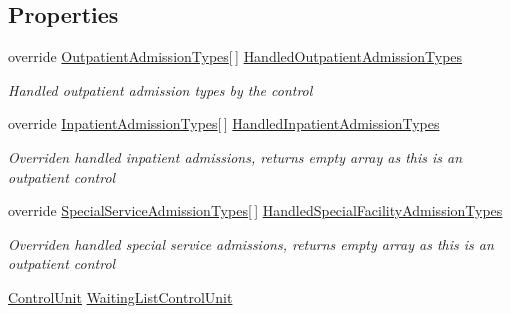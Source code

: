 \subsection*{Properties}
\begin{DoxyCompactItemize}
\item 
override \hyperlink{class_general_health_care_elements_1_1_treatment_admission_types_1_1_outpatient_admission_types}{Outpatient\+Admission\+Types}\mbox{[}$\,$\mbox{]} \hyperlink{class_general_health_care_elements_1_1_department_models_1_1_outpatient_1_1_control_unit_outpatient_a00f2c804949928f3f9b6671727c060bd}{Handled\+Outpatient\+Admission\+Types}
\begin{DoxyCompactList}\small\item\em Handled outpatient admission types by the control \end{DoxyCompactList}\item 
override \hyperlink{class_general_health_care_elements_1_1_treatment_admission_types_1_1_inpatient_admission_types}{Inpatient\+Admission\+Types}\mbox{[}$\,$\mbox{]} \hyperlink{class_general_health_care_elements_1_1_department_models_1_1_outpatient_1_1_control_unit_outpatient_afc1ac3cf602c8c0f2265ad08d79cccde}{Handled\+Inpatient\+Admission\+Types}
\begin{DoxyCompactList}\small\item\em Overriden handled inpatient admissions, returns empty array as this is an outpatient control \end{DoxyCompactList}\item 
override \hyperlink{class_general_health_care_elements_1_1_treatment_admission_types_1_1_special_service_admission_types}{Special\+Service\+Admission\+Types}\mbox{[}$\,$\mbox{]} \hyperlink{class_general_health_care_elements_1_1_department_models_1_1_outpatient_1_1_control_unit_outpatient_a56b71d567626a0e8dffd112885386f53}{Handled\+Special\+Facility\+Admission\+Types}
\begin{DoxyCompactList}\small\item\em Overriden handled special service admissions, returns empty array as this is an outpatient control \end{DoxyCompactList}\item 
\hyperlink{class_simulation_core_1_1_h_c_c_m_elements_1_1_control_unit}{Control\+Unit} \hyperlink{class_general_health_care_elements_1_1_department_models_1_1_outpatient_1_1_control_unit_outpatient_a5d8ab87d8e946d9828a25b1c51908d5b}{Waiting\+List\+Control\+Unit}

\end{DoxyCompactItemize}
